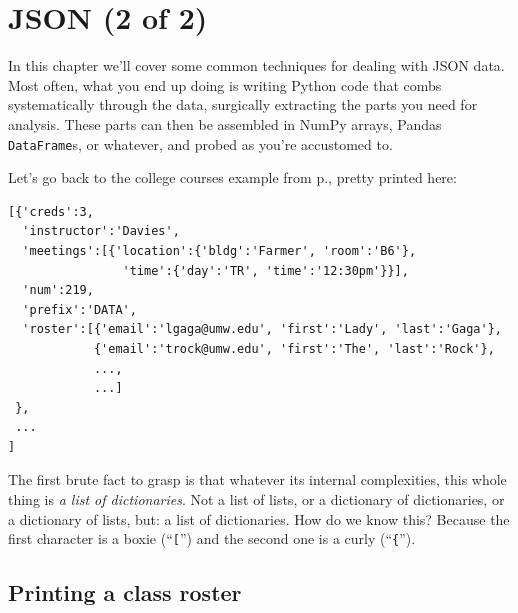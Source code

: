 \chapter{JSON (2 of 2)}
\label{ch:JSON2}


In this chapter we'll cover some common techniques for dealing with JSON data.
Most often, what you end up doing is writing Python code that combs
systematically through the data, surgically extracting the parts you need for
analysis. These parts can then be assembled in NumPy arrays, Pandas
\texttt{DataFrame}s, or whatever, and probed as you're accustomed to.


\label{coursesJsonPretty}

Let's go back to the college courses example from p.\pageref{coursesJson},
pretty printed here:


\begin{Verbatim}[fontsize=\footnotesize,samepage=true,frame=lines,framesep=2mm]
[{'creds':3,
  'instructor':'Davies',
  'meetings':[{'location':{'bldg':'Farmer', 'room':'B6'},
                'time':{'day':'TR', 'time':'12:30pm'}}],
  'num':219,
  'prefix':'DATA',
  'roster':[{'email':'lgaga@umw.edu', 'first':'Lady', 'last':'Gaga'},
            {'email':'trock@umw.edu', 'first':'The', 'last':'Rock'},
            ...,
            ...]
 },
 ...
]
\end{Verbatim}


The first brute fact to grasp is that whatever its internal complexities, this
whole thing is \textit{a list of dictionaries}. Not a list of lists, or a
dictionary of dictionaries, or a dictionary of lists, but: a list of
dictionaries. How do we know this? Because the first character is a boxie
(``\texttt{[}'') and the second one is a curly (``\texttt{\{}'').

\section{Printing a class roster}

